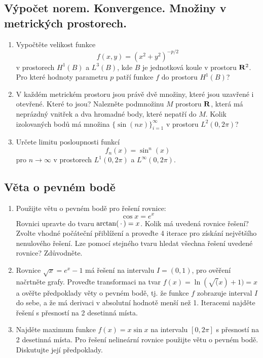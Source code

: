 \documentclass[a4paper,10pt]{article}
\def\to{\rightarrow}
\def\argdot{{\hspace{0.18em}\cdot\hspace{0.18em}}}
\def\Real{{\rm\bf R}}
\begin{document}
 \subsection{Výpočet norem. Konvergence. Množiny v metrických prostorech.}
 \begin{enumerate}
  \item Vypočtěte velikost funkce
  \[
      f(x,y)=(x^2+y^2)^{-p/2}
  \]
  v prostorech $H^1(B)$ a $L^3(B)$, kde $B$ je jednotková koule v prostoru $\Real^2$. Pro které hodnoty parametru $p$ patří funkce $f$ do prostoru $H^1(B)$?
  \item V každém metrickém prostoru jsou právě dvě množiny, které jsou uzavřené i otevřené. Které to jsou? Nalezněte podmnožinu $M$ prostoru $\Real$, která má neprázdný vnitřek a dva hromadné body, které nepatří do $M$. Kolik izolovaných bodů má množina
  $\{\sin(nx)\}_{i=1}^\infty$ v prostoru $L^2(0,2\pi)$?
  \item Určete limitu posloupnosti funkcí
     \[
        f_n(x)=\sin^n(x)
     \]
     pro $n\to \infty$ v prostorech $L^1(0,2\pi)$ a $L^\infty(0,2\pi)$.
 \end{enumerate}

 \subsection{Věta o pevném bodě}
 \begin{enumerate}
  \item Použijte větu o pevném bodě pro řešení rovnice:
  \[ \cos x = e^x\]
   Rovnici upravte do tvaru $\arctan( \argdot) = x$. 
   Kolik má uvedená rovnice řešení? Zvolte vhodné počáteční přiblížení a proveďte 4 iterace pro získání největšího nenulového řešení. Lze pomocí stejného tvaru hledat všechna řešení uvedené rovnice? Zdůvodněte.
  \item 
   Rovnice $\sqrt{x}=e^x-1$ má řešení na intervalu $I=(0,1)$, pro ověření načrtněte grafy. Proveďte transformaci na tvar
   $f(x)=\ln(\sqrt(x)+1)=x$ a ověřte předpoklady věty o pevném bodě, tj. že funkce $f$ zobrazuje interval $I$ do sebe,
   a že má derivaci v absolutní hodnotě menší než 1.
   Iteracemi najděte řešení s přesností na 2 desetinná místa.
   \item
   Najděte maximum funkce $f(x)=x\sin x$ na intervalu $[0,2\pi]$ s přesností na 2 desetinná místa. Pro řešení nelineární rovnice použijte větu o pevném bodě. Diskutujte její předpoklady.
 \end{enumerate}
\end{document}
